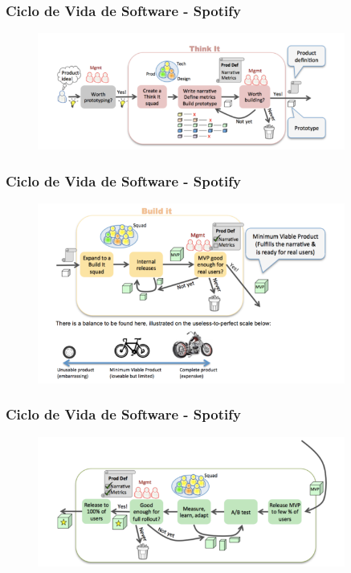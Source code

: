 \begin{frame}
 \frametitle{Ciclo de Vida de Software - Spotify}
  \begin{figure}
   \centering
   \includegraphics[width = 0.9\textwidth]{figs/005.png}
  \end{figure}	
\end{frame}

\begin{frame}
 \frametitle{Ciclo de Vida de Software - Spotify}
  \begin{figure}
   \centering
   \includegraphics[width = 0.9\textwidth]{figs/007.png}
  \end{figure}	
\end{frame}

\begin{frame}
 \frametitle{Ciclo de Vida de Software - Spotify}
  \begin{figure}
   \centering
   \includegraphics[width = 0.9\textwidth]{figs/008.png}
  \end{figure}	
\end{frame}

